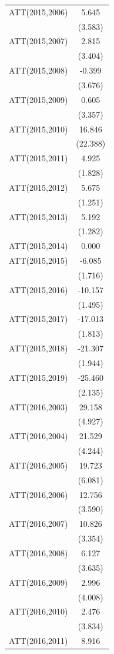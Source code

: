 \documentclass[
  12pt,
]{article}
\begin{document}
\begin{table}
\begin{tabular}[t]{lc}
ATT(2015,2006) & 5.645\\
 & (3.583)\\
ATT(2015,2007) & 2.815\\
 & (3.404)\\
ATT(2015,2008) & -0.399\\
 & (3.676)\\
ATT(2015,2009) & 0.605\\
 & (3.357)\\
ATT(2015,2010) & 16.846\\
 & (22.388)\\
ATT(2015,2011) & 4.925\\
 & (1.828)\\
ATT(2015,2012) & 5.675\\
 & (1.251)\\
ATT(2015,2013) & 5.192\\
 & (1.282)\\
ATT(2015,2014) & 0.000\\
ATT(2015,2015) & -6.085\\
 & (1.716)\\
ATT(2015,2016) & -10.157\\
 & (1.495)\\
ATT(2015,2017) & -17.013\\
 & (1.813)\\
ATT(2015,2018) & -21.307\\
 & (1.944)\\
ATT(2015,2019) & -25.460\\
 & (2.135)\\
ATT(2016,2003) & 29.158\\
 & (4.927)\\
ATT(2016,2004) & 21.529\\
 & (4.244)\\
ATT(2016,2005) & 19.723\\
 & (6.081)\\
ATT(2016,2006) & 12.756\\
 & (3.590)\\
ATT(2016,2007) & 10.826\\
 & (3.354)\\
ATT(2016,2008) & 6.127\\
 & (3.635)\\
ATT(2016,2009) & 2.996\\
 & (4.008)\\
ATT(2016,2010) & 2.476\\
 & (3.834)\\
ATT(2016,2011) & 8.916\\

\end{tabular}
\end{table}
\end{document}
